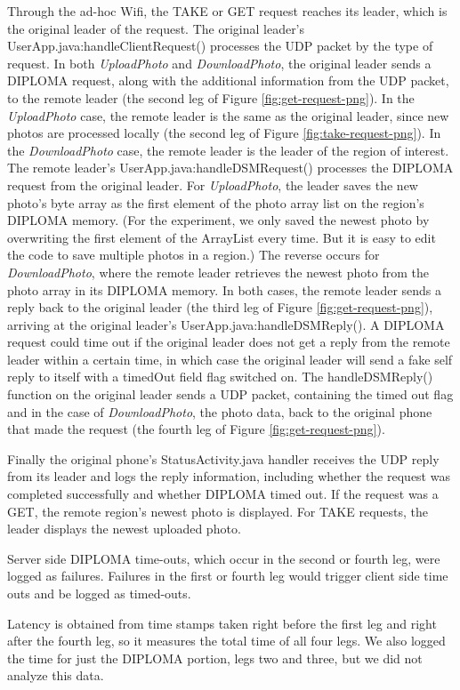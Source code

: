 Through the ad-hoc Wifi, the TAKE or GET request reaches its leader, which is the original leader of the request. The original leader's UserApp.java:handleClientRequest() processes the UDP packet by the type of request. In both {\it UploadPhoto} and {\it DownloadPhoto}, the original leader sends a DIPLOMA request, along with the additional information from the UDP packet, to the remote leader (the second leg of Figure \ref{fig:get-request-png}). In the {\it UploadPhoto} case, the remote leader is the same as the original leader, since new photos are processed locally (the second leg of Figure \ref{fig:take-request-png}). In the {\it DownloadPhoto} case, the remote leader is the leader of the region of interest. The remote leader's UserApp.java:handleDSMRequest() processes the DIPLOMA request from the original leader. For {\it UploadPhoto}, the leader saves the new photo's byte array as the first element of the photo array list on the region's DIPLOMA memory. (For the experiment, we only saved the newest photo by overwriting the first element of the ArrayList every time. But it is easy to edit the code to save multiple photos in a region.) The reverse occurs for {\it DownloadPhoto}, where the remote leader retrieves the newest photo from the photo array in its DIPLOMA memory.  In both cases, the remote leader sends a reply back to the original leader (the third leg of Figure \ref{fig:get-request-png}), arriving at the original leader's UserApp.java:handleDSMReply(). A DIPLOMA request could time out if the original leader does not get a reply from the remote leader within a certain time, in which case the original leader will send a fake self reply to itself with a timedOut field flag switched on. The handleDSMReply() function on the original leader sends a UDP packet, containing the timed out flag and in the case of {\it DownloadPhoto}, the photo data, back to the original phone that made the request (the fourth leg of Figure \ref{fig:get-request-png}).

Finally the original phone's StatusActivity.java handler receives the UDP reply from its leader and logs the reply information, including whether the request was completed successfully and whether DIPLOMA timed out. If the request was a GET, the remote region's newest photo is displayed. For TAKE requests, the leader displays the newest uploaded photo.

Server side DIPLOMA time-outs, which occur in the second or fourth leg, were logged as failures. Failures in the first or fourth leg would trigger client side time outs and be logged as timed-outs.

Latency is obtained from time stamps taken right before the first leg and right after the fourth leg, so it measures the total time of all four legs. We also logged the time for just the DIPLOMA portion, legs two and three, but we did not analyze this data.